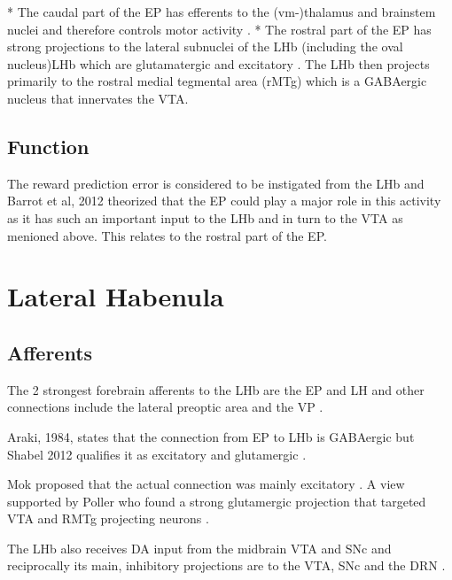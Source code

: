\documentclass[12pt,a4paper]{article}
\let\oldsection\section
\renewcommand\section{\clearpage\oldsection}
\begin{document}
  * The caudal part of the EP has efferents to the (vm-)thalamus and brainstem nuclei and therefore controls motor activity \citep{Rajakumar1993}  \citep{Wallace2017}.
  * The rostral part of the EP has strong projections to the lateral subnuclei of the LHb (including the oval nucleus)LHb \citep{Rajakumar1993}\citep{Hong2008} which are glutamatergic and excitatory \citep{Shabel2012} \citep{Wallace2017}. The LHb then projects primarily to the rostral medial tegmental area (rMTg) which is a GABAergic nucleus that innervates the VTA.

\subsection{Function}

The reward prediction error is considered to be instigated from the LHb and Barrot et al, 2012 theorized that the EP could play a major role in this activity as it has such an important input to the LHb \citep{Barrot2012} and in turn to the VTA as menioned above. This relates to the rostral part of the EP.







\section{Lateral Habenula}

\subsection{Afferents}

The 2 strongest forebrain afferents to the LHb are the EP and LH and other connections include the lateral preoptic area and the VP \citep{Parent1981}. 

Araki, 1984, states that the connection from EP to LHb is GABAergic \citep{Araki1984} but Shabel 2012 qualifies it as excitatory and glutamergic \citep{Shabel2012}.

Mok proposed that the actual connection was mainly excitatory \citep{Mok1974}. A view supported by Poller who found a strong glutamergic projection that targeted VTA and RMTg projecting neurons \citep{Poller2013}.

The LHb also receives DA input from the midbrain VTA and SNc \citep{Kowski2009} and reciprocally its main, inhibitory projections are to the VTA, SNc and the DRN \citep{Ji2007}\citep{Christoph1986}\citep{Rajakumar1993}.
\end{document}
